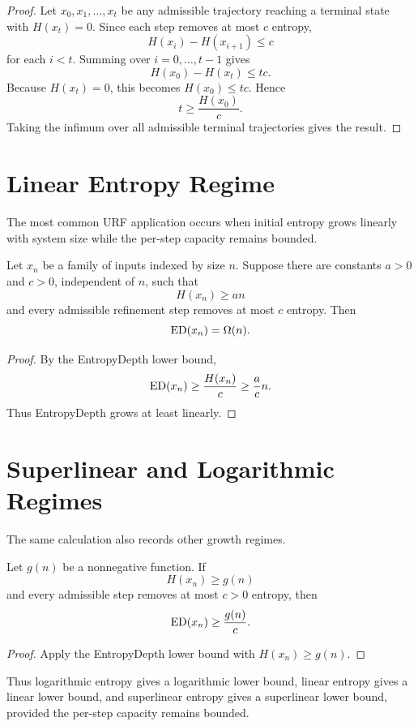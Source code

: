 \begin{proof}
Let \(x_0,x_1,\ldots,x_t\) be any admissible trajectory reaching a terminal
state with \(H(x_t)=0\). Since each step removes at most \(c\) entropy,
\[
H(x_i)-H(x_{i+1})\le c
\]
for each \(i<t\). Summing over \(i=0,\ldots,t-1\) gives
\[
H(x_0)-H(x_t)\le tc.
\]
Because \(H(x_t)=0\), this becomes \(H(x_0)\le tc\). Hence
\[
t\ge \frac{H(x_0)}{c}.
\]
Taking the infimum over all admissible terminal trajectories gives the result.
\end{proof}

\section{Linear Entropy Regime}

The most common URF application occurs when initial entropy grows linearly
with system size while the per-step capacity remains bounded.

\begin{theorem}
Let \(x_n\) be a family of inputs indexed by size \(n\). Suppose there are
constants \(a>0\) and \(c>0\), independent of \(n\), such that
\[
H(x_n)\ge an
\]
and every admissible refinement step removes at most \(c\) entropy. Then
\[
\mathrm{ED}(x_n)=\Omega(n).
\]
\end{theorem}

\begin{proof}
By the EntropyDepth lower bound,
\[
\mathrm{ED}(x_n)\ge \frac{H(x_n)}{c}\ge \frac{a}{c}n.
\]
Thus EntropyDepth grows at least linearly.
\end{proof}

\section{Superlinear and Logarithmic Regimes}

The same calculation also records other growth regimes.

\begin{theorem}
Let \(g(n)\) be a nonnegative function. If
\[
H(x_n)\ge g(n)
\]
and every admissible step removes at most \(c>0\) entropy, then
\[
\mathrm{ED}(x_n)\ge \frac{g(n)}{c}.
\]
\end{theorem}

\begin{proof}
Apply the EntropyDepth lower bound with \(H(x_n)\ge g(n)\).
\end{proof}

Thus logarithmic entropy gives a logarithmic lower bound, linear entropy gives
a linear lower bound, and superlinear entropy gives a superlinear lower bound,
provided the per-step capacity remains bounded.


